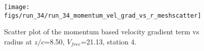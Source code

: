 \begin{figure}[H]
\centering
\texttt{[image: figs/run\_34/run\_34\_momentum\_vel\_grad\_vs\_r\_meshscatter]}
\caption{Scatter plot of the momentum based velocity gradient term vs radius at $z/c$=8.50, $V_{free}$=21.13, station 4.}
\label{fig:run_34_momentum_vel_grad_vs_r_meshscatter}
\end{figure}


